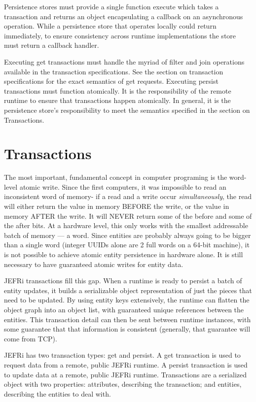\documentclass{article}
\begin{document}
Persistence stores must provide a single function {\ilcode execute} which
takes a transaction and returns an object encapsulating a callback on an
asynchronous operation. While a persistence store that operates locally could
return immediately, to ensure consistency across runtime implementations the
store must return a callback handler.

Executing {\ilcode get} transactions must handle the myriad of filter and join
operations available in the transaction specifications. See the section on
transaction specifications for the exact semantics of get requests.  Executing
{\ilcode persist} transactions must function atomically.  It is the
responsibility of the remote runtime to ensure that transactions happen
atomically. In general, it is the persistence store's responsibility to meet the
semantics specified in the section on Transactions.

\section{Transactions}

The most important, fundamental concept in computer programing is the word-level
atomic write. Since the first computers, it was impossible to read an
inconsistent word of memory- if a read and a write occur {\sl simultaneously},
the read will either return the value in memory BEFORE the write, or the value
in memory AFTER the write. It will NEVER return some of the before and some of
the after bits. At a hardware level, this only works with the smallest
addressable batch of memory --- a word. Since entities are probably always going
to be bigger than a single word (integer UUIDs alone are 2 full words on a
64-bit machine), it is not possible to achieve atomic entity persistence in
hardware alone. It is still necessary to have guaranteed atomic writes for
entity data.

JEFRi transactions fill this gap. When a runtime is ready to persist a batch
of entity updates, it builds a serializable object representation of just the
pieces that need to be updated. By using entity keys extensively, the runtime
can flatten the object graph into an object list, with guaranteed unique
references between the entities. This transaction detail can then be sent
between runtime instances, with some guarantee that that information is
consistent (generally, that guarantee will come from TCP).

JEFRi has two transaction types: {\ilcode get} and {\ilcode persist}. A {\ilcode
get} transaction is used to request data from a remote, public JEFRi runtime. A
{\ilcode persist} transaction is used to update data at a remote, public JEFRi
runtime. Transactions are a serialized object with two properties: {\ilcode
attributes}, describing the transaction; and {\ilcode entities}, describing the
entities to deal with.
\end{document}
